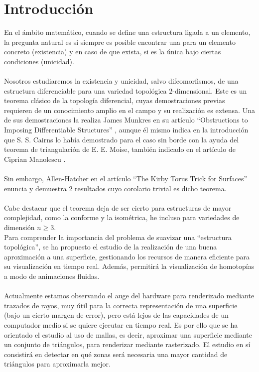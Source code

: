 %


\chapter{Introducción}

En el ámbito matemático, cuando se define una estructura ligada a un elemento, la pregunta natural es si siempre es posible encontrar una para un elemento concreto (existencia) y en caso de que exista, si es la única bajo ciertas condiciones (unicidad).\\
\\Nosotros estudiaremos la existencia y unicidad, salvo difeomorfismos, de una estructura diferenciable para una variedad topológica $2$-dimensional. Este es un teorema clásico de la topología diferencial, cuyas demostraciones previas requieren de un conocimiento amplio en el campo y su realización es extensa. Una de sus demostraciones la realiza James Munkres en su artículo ``Obstructions to Imposing Differentiable Structures'' \cite{Munkres}, aunque él mismo indica en la introducción que S. S. Cairns lo había demostrado para el caso sin borde con la ayuda del teorema de triangulación de E. E. Moise, también indicado en el artículo de Ciprian Manolescu \cite{Historical}.\\
\\Sin embargo, Allen-Hatcher en el artículo ``The Kirby Torus Trick for Surfaces'' \cite{arXiv:1312.3518} enuncia y demuestra $2$ resultados cuyo corolario trivial es dicho teorema.\\
\\Cabe destacar que el teorema deja de ser cierto para estructuras de mayor complejidad, como la conforme y la isométrica, he incluso para variedades de dimensión $n \geq 3$.
\\Para comprender la importancia del problema de suavizar una ``estructura topológica'', se ha propuesto el estudio de la realización de una buena aproximación a una superficie, gestionando los recursos de manera eficiente para su visualización en tiempo real. Además, permitirá la visualización de homotopías a modo de animaciones fluidas.\\
\\Actualmente estamos observando el auge del hardware para renderizado mediante trazados de rayos, muy útil para la correcta representación de una superficie (bajo un cierto margen de error), pero está lejos de las capacidades de un computador medio si se quiere ejecutar en tiempo real. Es por ello que se ha orientado el estudio al uso de mallas, es decir, aproximar una superficie mediante un conjunto de triángulos, para renderizar mediante rasterizado. El estudio en sí consistirá en detectar en qué zonas será necesaria una mayor cantidad de triángulos para aproximarla mejor.\\
